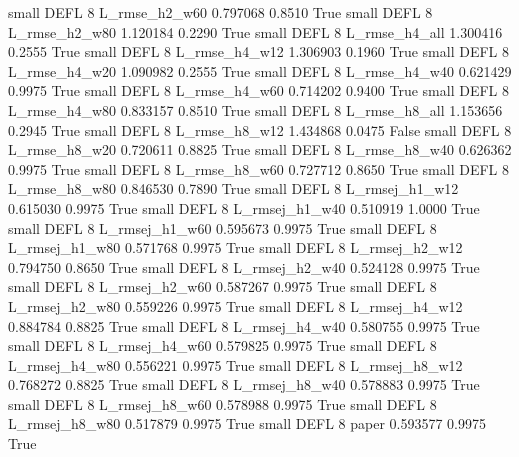      small     DEFL                 8  L_rmse_h2_w60   0.797068      0.8510    True
     small     DEFL                 8  L_rmse_h2_w80   1.120184      0.2290    True
     small     DEFL                 8  L_rmse_h4_all   1.300416      0.2555    True
     small     DEFL                 8  L_rmse_h4_w12   1.306903      0.1960    True
     small     DEFL                 8  L_rmse_h4_w20   1.090982      0.2555    True
     small     DEFL                 8  L_rmse_h4_w40   0.621429      0.9975    True
     small     DEFL                 8  L_rmse_h4_w60   0.714202      0.9400    True
     small     DEFL                 8  L_rmse_h4_w80   0.833157      0.8510    True
     small     DEFL                 8  L_rmse_h8_all   1.153656      0.2945    True
     small     DEFL                 8  L_rmse_h8_w12   1.434868      0.0475   False
     small     DEFL                 8  L_rmse_h8_w20   0.720611      0.8825    True
     small     DEFL                 8  L_rmse_h8_w40   0.626362      0.9975    True
     small     DEFL                 8  L_rmse_h8_w60   0.727712      0.8650    True
     small     DEFL                 8  L_rmse_h8_w80   0.846530      0.7890    True
     small     DEFL                 8 L_rmsej_h1_w12   0.615030      0.9975    True
     small     DEFL                 8 L_rmsej_h1_w40   0.510919      1.0000    True
     small     DEFL                 8 L_rmsej_h1_w60   0.595673      0.9975    True
     small     DEFL                 8 L_rmsej_h1_w80   0.571768      0.9975    True
     small     DEFL                 8 L_rmsej_h2_w12   0.794750      0.8650    True
     small     DEFL                 8 L_rmsej_h2_w40   0.524128      0.9975    True
     small     DEFL                 8 L_rmsej_h2_w60   0.587267      0.9975    True
     small     DEFL                 8 L_rmsej_h2_w80   0.559226      0.9975    True
     small     DEFL                 8 L_rmsej_h4_w12   0.884784      0.8825    True
     small     DEFL                 8 L_rmsej_h4_w40   0.580755      0.9975    True
     small     DEFL                 8 L_rmsej_h4_w60   0.579825      0.9975    True
     small     DEFL                 8 L_rmsej_h4_w80   0.556221      0.9975    True
     small     DEFL                 8 L_rmsej_h8_w12   0.768272      0.8825    True
     small     DEFL                 8 L_rmsej_h8_w40   0.578883      0.9975    True
     small     DEFL                 8 L_rmsej_h8_w60   0.578988      0.9975    True
     small     DEFL                 8 L_rmsej_h8_w80   0.517879      0.9975    True
     small     DEFL                 8          paper   0.593577      0.9975    True
